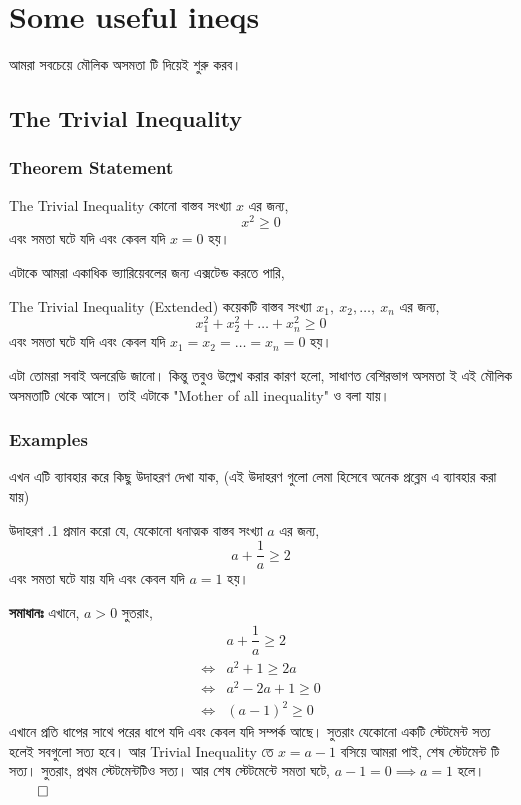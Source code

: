 \documentclass[12pt]{article}
\begin{document}
\newpage
\section{Some useful ineqs}
আমরা সবচেয়ে মৌলিক অসমতা টি দিয়েই শুরু করব। 
\subsection{The Trivial Inequality}
\subsubsection{Theorem Statement}
\begin{theom}{The Trivial Inequality}
    কোনো বাস্তব সংখ্যা $x$ এর জন্য, 
    $$x^2 \geq 0$$
    এবং সমতা ঘটে যদি এবং কেবল যদি $x = 0$ হয়।
\end{theom}
এটাকে আমরা একাধিক ভ্যারিয়েবলের জন্য এক্সটেন্ড করতে পারি,
\begin{theom}{The Trivial Inequality (Extended)}
    কয়েকটি বাস্তব সংখ্যা $x_1, \ x_2, \dots,\ x_n$ এর জন্য, 
    $$x_1^2 + x_2^2 + \dots + x_n^2 \geq 0$$
    এবং সমতা ঘটে যদি এবং কেবল যদি $x_1 = x_2 = \dots = x_n = 0$ হয়।
\end{theom}
এটা তোমরা সবাই অলরেডি জানো। কিন্তু তবুও উল্লেখ করার কারণ হলো, 
সাধাণত বেশিরভাগ অসমতা ই এই মৌলিক অসমতাটি থেকে আসে। তাই এটাকে 
"Mother of all inequality" ও বলা যায়।\\
\subsubsection{Examples}
এখন এটি ব্যাবহার করে কিছু উদাহরণ দেখা যাক, (এই উদাহরণ গুলো লেমা হিসেবে অনেক 
প্রব্লেম এ ব্যাবহার করা যায়) 
\begin{exam} {উদাহরণ \thesubsubsection.1}
    প্রমান করো যে, যেকোনো ধনাত্মক বাস্তব সংখ্যা $a$ এর জন্য, 
    $$a + \dfrac1a \geq  2$$
    এবং সমতা ঘটে যায় যদি এবং কেবল যদি $a = 1$ হয়। 
\end{exam}

\begin{sol}
    \textbf{সমাধানঃ} এখানে, $a > 0$ সুতরাং,
    \begin{align*}
        &a + \dfrac{1}{a} \geq 2\\
        \iff & a^2 + 1 \geq 2a\\
        \iff & a^2 - 2a + 1 \geq 0\\
        \iff & (a-1)^2 \geq 0
    \end{align*}
    এখানে প্রতি ধাপের সাথে পরের ধাপে যদি এবং কেবল যদি সম্পর্ক আছে। সুতরাং যেকোনো একটি স্টেটমেন্ট সত্য হলেই 
    সবগুলো সত্য হবে। আর Trivial Inequality তে $x = a-1$ বসিয়ে আমরা পাই, 
    শেষ স্টেটমেন্ট টি সত্য। সুতরাং, প্রথম স্টেটমেন্টটিও সত্য।
    আর শেষ স্টেটমেন্টে সমতা ঘটে, $a-1 = 0 \implies a = 1$ হলে। $\qed$
\end{sol}
\end{document}
